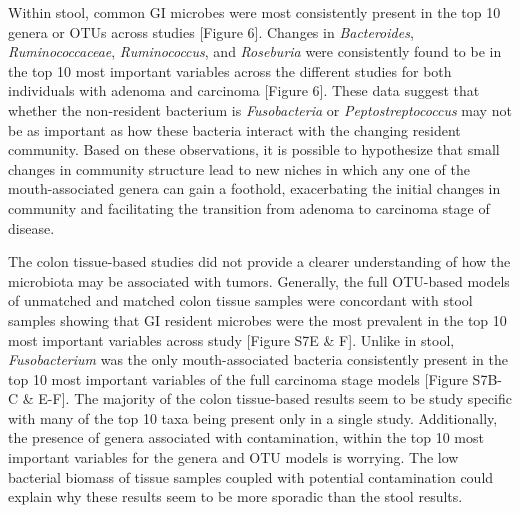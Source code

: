 \documentclass[12pt,]{article}
\begin{document}
Within stool, common GI microbes were most consistently present in the
top 10 genera or OTUs across studies {[}Figure 6{]}. Changes in
\emph{Bacteroides}, \emph{Ruminococcaceae}, \emph{Ruminococcus}, and
\emph{Roseburia} were consistently found to be in the top 10 most
important variables across the different studies for both individuals
with adenoma and carcinoma {[}Figure 6{]}. These data suggest that
whether the non-resident bacterium is \emph{Fusobacteria} or
\emph{Peptostreptococcus} may not be as important as how these bacteria
interact with the changing resident community. Based on these
observations, it is possible to hypothesize that small changes in
community structure lead to new niches in which any one of the
mouth-associated genera can gain a foothold, exacerbating the initial
changes in community and facilitating the transition from adenoma to
carcinoma stage of disease.

The colon tissue-based studies did not provide a clearer understanding
of how the microbiota may be associated with tumors. Generally, the full
OTU-based models of unmatched and matched colon tissue samples were
concordant with stool samples showing that GI resident microbes were the
most prevalent in the top 10 most important variables across study
{[}Figure S7E \& F{]}. Unlike in stool, \emph{Fusobacterium} was the
only mouth-associated bacteria consistently present in the top 10 most
important variables of the full carcinoma stage models {[}Figure S7B-C
\& E-F{]}. The majority of the colon tissue-based results seem to be
study specific with many of the top 10 taxa being present only in a
single study. Additionally, the presence of genera associated with
contamination, within the top 10 most important variables for the genera
and OTU models is worrying. The low bacterial biomass of tissue samples
coupled with potential contamination could explain why these results
seem to be more sporadic than the stool results.
\end{document}
